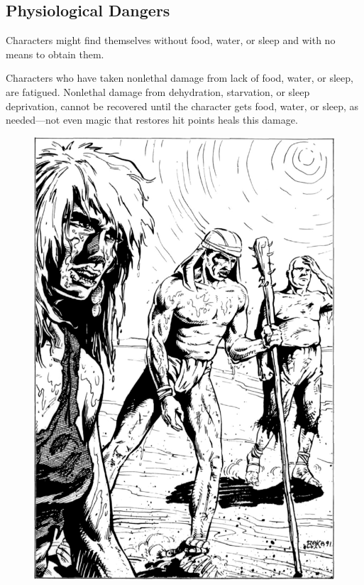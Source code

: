 \subsection{Physiological Dangers}
Characters might find themselves without food, water, or sleep and with no means to obtain them.

Characters who have taken nonlethal damage from lack of food, water, or sleep, are fatigued. Nonlethal damage from dehydration, starvation, or sleep deprivation, cannot be recovered until the character gets food, water, or sleep, as needed---not even magic that restores hit points heals this damage.

\begin{figure}[t!]
\centering
\includegraphics[width=\columnwidth]{images/dehydration.png}
\WOTC
\end{figure}

